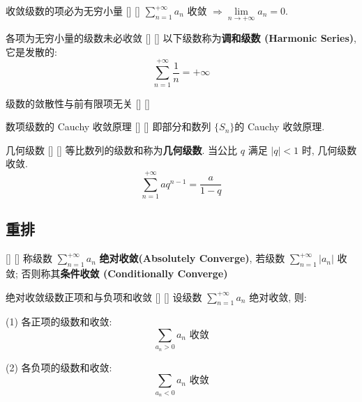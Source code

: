 \documentclass[UTF8]{ctexart}
\begin{document}
			\begin{ppt}
			    []
			    {收敛级数的项必为无穷小量}
			    []
			    []
				\(\sum\limits_{n=1}^{+\infty}a_n\) 收敛 \(\Longrightarrow\lim\limits_{n\to+\infty}a_n=0\). 
			\end{ppt}
			
			\begin{cxmp}
			    []
			    {各项为无穷小量的级数未必收敛}
			    []
			    []
				以下级数称为\textbf{调和级数 (Harmonic Series)}, 它是发散的: 
				\[\sum_{n=1}^{+\infty}\frac{1}{n}=+\infty\]
			\end{cxmp}
			
			\begin{ppt}
			    []
			    {级数的敛散性与前有限项无关}
			    []
			    []
			\end{ppt}

			\begin{thm}
			    []
			    {数项级数的 Cauchy 收敛原理}
			    []
			    []
				即部分和数列 \(\{S_n\}\)的 Cauchy 收敛原理. 
			\end{thm}
			
			\begin{xmp}
			    []
			    {几何级数}
			    []
			    []
				等比数列的级数和称为\textbf{几何级数}. 当公比 \(q\) 满足 \(|q|<1\) 时, 几何级数收敛. 
				\[\sum_{n=1}^{+\infty}aq^{n-1}=\frac{a}{1-q}\]
			\end{xmp}

		

		\subsection{重排}
		
			\begin{dfn}
			    []
			    {}
			    []
			    []
				称级数 \(\sum\limits_{n=1}^{+\infty}a_n\) \textbf{绝对收敛(Absolutely Converge)}, 若级数 \(\sum\limits_{n=1}^{+\infty}|a_n|\) 收敛; 否则称其\textbf{条件收敛 (Conditionally Converge)}
			\end{dfn}
			
			\begin{ppt}
			    []
			    {绝对收敛级数正项和与负项和收敛}
			    []
			    []
				设级数 \(\sum\limits_{n=1}^{+\infty}a_n\) 绝对收敛, 则: 
				
				(1) 各正项的级数和收敛: 
				\[\sum_{a_n>0}a_n\text{ 收敛}\]

				(2) 各负项的级数和收敛: 
				\[\sum_{a_n<0}a_n\text{ 收敛}\]
			\end{ppt}
\end{document}
